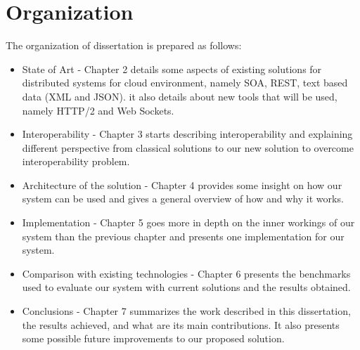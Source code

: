 \section{Organization}
\label{section:organization}

The organization of dissertation is prepared as follows:

\begin{itemize}
\item State of Art - Chapter 2 details some aspects of existing solutions for distributed systems for cloud environment, namely SOA, REST, text based data (XML and JSON). it also details about new tools that will be used, namely HTTP/2 and Web Sockets.
\item Interoperability - Chapter 3 starts describing interoperability and explaining different perspective from classical solutions to our new solution to overcome interoperability problem.
\item Architecture of the solution - Chapter 4 provides some insight on how our system can be used and gives a general overview of how and why it works.
\item Implementation - Chapter 5 goes more in depth on the inner workings of our system than the previous chapter and presents one implementation for our system.
\item Comparison with existing technologies - Chapter 6 presents the benchmarks used to evaluate our system with current solutions and the results obtained.
\item Conclusions - Chapter 7 summarizes the work described in this dissertation, the results achieved, and what are its main contributions. It also presents some possible future improvements to our proposed solution.
\end{itemize}
